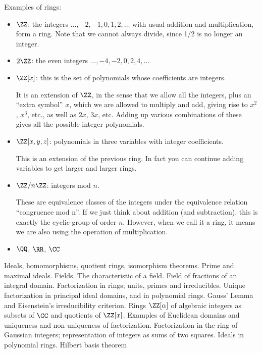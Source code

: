 \begin{example}
Examples of rings:
\begin{itemize}
\item $\ZZ$: the integers $\dots,-2,-1,0,1,2,\dots$ with usual addition and multiplication, form a ring. Note that we cannot always divide, since 1/2 is no longer an integer.

\item $2\ZZ$: the even integers $\dots,-4,-2,0,2,4,\dots$

\item $\ZZ[x]$: this is the set of polynomials whose coefficients are integers. 

It is an extension of $\ZZ$, in the sense that we allow all the integers, plus an “extra symbol” $x$, which we are allowed to multiply and add, giving rise to $x^2$, $x^3$, etc., as well as $2x$, $3x$, etc. Adding up various combinations of these gives all the possible integer polynomials.

\item $\ZZ[x,y,z]$: polynomials in three variables with integer coefficients. 

This is an extension of the previous ring. In fact you can continue adding variables to get larger and larger rings.

\item $\ZZ/n\ZZ$: integers mod $n$. 

These are equivalence classes of the integers under the equivalence relation “congruence mod n”. If we just think about addition (and subtraction), this is exactly the cyclic group of order $n$. However, when we call it a ring, it means we are also using the operation of multiplication.

\item $\QQ$, $\RR$, $\CC$
\end{itemize}
\end{example}

Ideals, homomorphisms, quotient rings, isomorphism theorems. Prime and maximal ideals. Fields. The characteristic of a field. Field of fractions of an
integral domain.
Factorization in rings; units, primes and irreducibles. Unique factorization in principal ideal domains, and
in polynomial rings. Gauss’ Lemma and Eisenstein’s irreducibility criterion.
Rings $\ZZ[\alpha]$ of algebraic integers as subsets of $\CC$ and quotients of $\ZZ[x]$. Examples of Euclidean domains and
uniqueness and non-uniqueness of factorization. Factorization in the ring of Gaussian integers; representation of integers as sums of two squares.
Ideals in polynomial rings. Hilbert basis theorem